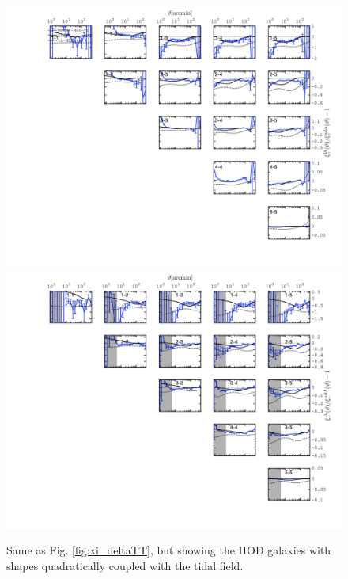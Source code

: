 \begin{figure}
\includegraphics[width=\columnwidth]{graphs/frac_xip_sims_HOD_TT.jpg}
\includegraphics[width=\columnwidth]{graphs/frac_xim_sims_HOD_TT.jpg}
\caption{Same as Fig. \ref{fig:xi_deltaTT}, but showing the HOD galaxies with shapes quadratically coupled with the tidal field. }
\label{fig:xi_hod_tt}
\end{figure}